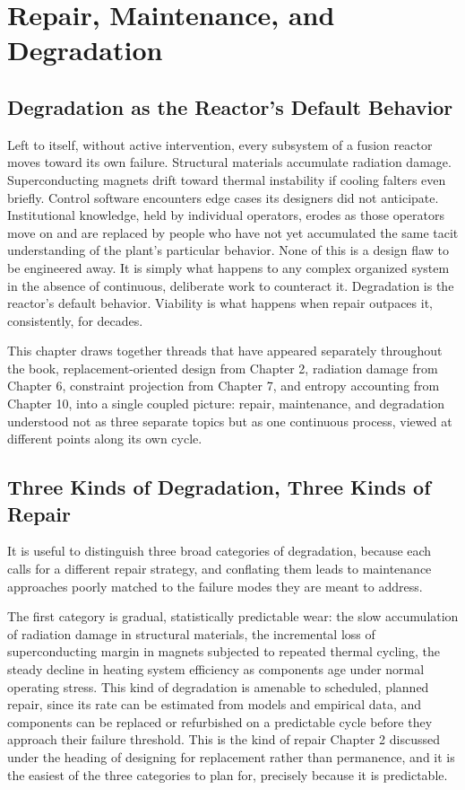 \chapter{Repair, Maintenance, and Degradation}

\section{Degradation as the Reactor's Default Behavior}

Left to itself, without active intervention, every subsystem of a fusion reactor moves toward its own failure. Structural materials accumulate radiation damage. Superconducting magnets drift toward thermal instability if cooling falters even briefly. Control software encounters edge cases its designers did not anticipate. Institutional knowledge, held by individual operators, erodes as those operators move on and are replaced by people who have not yet accumulated the same tacit understanding of the plant's particular behavior. None of this is a design flaw to be engineered away. It is simply what happens to any complex organized system in the absence of continuous, deliberate work to counteract it. Degradation is the reactor's default behavior. Viability is what happens when repair outpaces it, consistently, for decades.

This chapter draws together threads that have appeared separately throughout the book, replacement-oriented design from Chapter 2, radiation damage from Chapter 6, constraint projection from Chapter 7, and entropy accounting from Chapter 10, into a single coupled picture: repair, maintenance, and degradation understood not as three separate topics but as one continuous process, viewed at different points along its own cycle.

\section{Three Kinds of Degradation, Three Kinds of Repair}

It is useful to distinguish three broad categories of degradation, because each calls for a different repair strategy, and conflating them leads to maintenance approaches poorly matched to the failure modes they are meant to address.

The first category is gradual, statistically predictable wear: the slow accumulation of radiation damage in structural materials, the incremental loss of superconducting margin in magnets subjected to repeated thermal cycling, the steady decline in heating system efficiency as components age under normal operating stress. This kind of degradation is amenable to scheduled, planned repair, since its rate can be estimated from models and empirical data, and components can be replaced or refurbished on a predictable cycle before they approach their failure threshold. This is the kind of repair Chapter 2 discussed under the heading of designing for replacement rather than permanence, and it is the easiest of the three categories to plan for, precisely because it is predictable.

